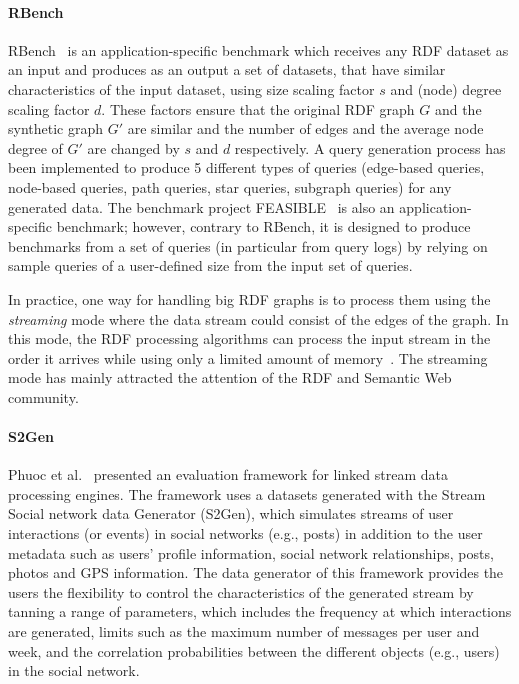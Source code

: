 \paragraph{RBench} RBench~\cite{Qiao:2015:RAR:2723372.2746479} is an application-specific benchmark which receives any RDF dataset as an input and produces as an output a set of datasets, that have similar characteristics of the input dataset, using size scaling factor $s$ and (node) degree scaling factor $d$. These factors ensure that the original RDF graph $G$ and the synthetic graph $G'$ are similar and the number of edges and the average node degree of $G'$ are changed by $s$ and $d$ respectively. \iffalse A generated benchmark dataset is considered similar to the given dataset if their values for the dataset evaluation metrics and query evaluation times for different techniques are similar. Three evaluation metrics are utilized for this purpose: dataset coherence (i.e., a measure how uniformly predicates are distributed among the same type/class), relationship specialty (i.e., the number of occurrences of the same predicate associated with each resource), and literal diversity.\fi A query generation process has been implemented to produce 5 different types of queries (edge-based queries, node-based queries, path queries, star queries, subgraph queries) for any generated data. The benchmark project FEASIBLE~\cite{Saleem2015} is also an application-specific benchmark; however, contrary to RBench, it is designed to produce benchmarks from a set of queries (in particular from query logs) by relying on sample queries of a user-defined
size from the input set of queries.

In practice, one way for handling big RDF graphs is to process them using the
\emph{streaming} mode where the data stream could consist of the edges of the
graph. In this mode, the RDF processing algorithms can process the input
stream in the order it arrives while using only a limited amount of
memory~\cite{mcgregor2014graph}. The streaming mode has mainly  attracted the attention of the
RDF and Semantic Web community.

\paragraph{S2Gen}   Phuoc et al.~\cite{le2012linked} presented
an evaluation framework for linked stream data processing engines. The framework
uses a datasets generated with the Stream Social network data Generator
(S2Gen), which
simulates streams of user interactions (or events) in social networks
(e.g., posts) in addition to the  user metadata such as users' profile
information, social network relationships, posts, photos and GPS information.
The data generator of this framework provides the users the flexibility to
control the characteristics of the generated stream by tanning a range of
parameters, which includes the frequency at which interactions are generated,
limits such as the maximum number of messages per user
and week, and the correlation probabilities between the different objects (e.g.,
users) in the social network.

